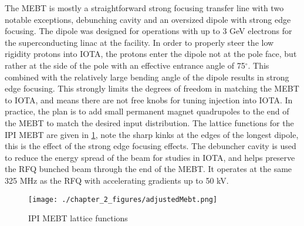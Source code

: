 The MEBT is mostly a straightforward strong focusing transfer line with two notable exceptions, debunching cavity and an oversized dipole with strong edge focusing. The dipole was designed for operations with up to 3 GeV electrons for the superconducting linac at the facility. In order to properly steer the low rigidity protons into IOTA, the protons enter the dipole not at the pole face, but rather at the side of the pole with an effective entrance angle of 75$^\circ$. This combined with the relatively large bending angle of the dipole results in strong edge focusing. This strongly limits the degrees of freedom in matching the MEBT to IOTA, and means there are not free knobs for tuning injection into IOTA. In practice, the plan is to add small permanent magnet quadrupoles to the end of the MEBT to match the desired input distribution. The lattice functions for the IPI MEBT are given in \ref{fig:mebtLattice}, note the sharp kinks at the edges of the longest dipole, this is the effect of the strong edge focusing effects. The debuncher cavity is used to reduce the energy spread of the beam for studies in IOTA, and helps preserve the RFQ bunched beam through the end of the MEBT. It operates at the same 325 MHz as the RFQ with accelerating gradients up to 50 kV.

\begin{figure}
	\centering
	\texttt{[image: ./chapter\_2\_figures/adjustedMebt.png]}
	\caption{IPI MEBT lattice functions}
	\label{fig:mebtLattice}
\end{figure}


